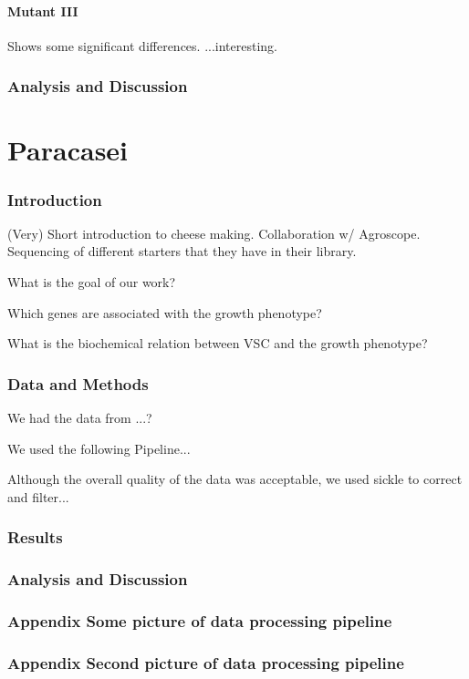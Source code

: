 \documentclass[10pt,a4paper]{article}
\begin{document}
\subsection{Mutant III}
Shows some significant differences. ...interesting.

\section{Analysis and Discussion}

\pagebreak
\part{Paracasei}
\setcounter{section}{0}

\section{Introduction}
(Very) Short introduction to cheese making. Collaboration w/ Agroscope. Sequencing of different starters that they have in their library.

What is the goal of our work?

Which genes are associated with the growth phenotype?

What is the biochemical relation between VSC and the growth phenotype?


\section{Data and Methods}
We had the data from ...?

We used the following Pipeline...

Although the overall quality of the data was acceptable, we used sickle to correct and filter...

\section{Results}




\section{Analysis and Discussion}

\pagebreak
\appendix
\section{Appendix Some picture of data processing pipeline}
\section{Appendix Second picture of data processing pipeline}

\printbibliography
\end{document}
